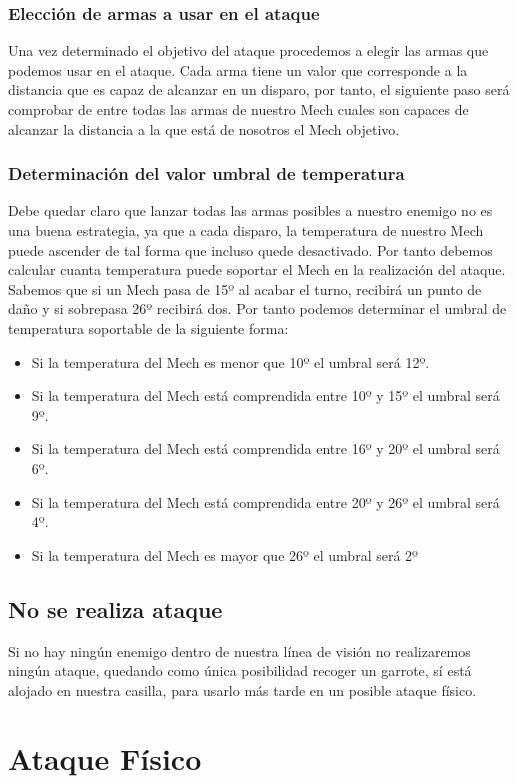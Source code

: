 \documentclass[a4paper,12pt,oneside]{book}
\begin{document}
\subsubsection{Elección de armas a usar en el ataque}
Una vez determinado el objetivo del ataque procedemos a elegir las armas que podemos usar en el ataque. Cada arma tiene un valor que corresponde a la distancia que es capaz de alcanzar en un disparo, por tanto, el siguiente paso será comprobar de entre todas las armas de nuestro Mech cuales son capaces de alcanzar la distancia a la que está de nosotros el Mech objetivo. 
\subsubsection{Determinación del valor umbral de temperatura}
Debe quedar claro que lanzar todas las armas posibles a nuestro enemigo no es una buena estrategia, ya que a cada disparo, la temperatura de nuestro Mech puede ascender de tal forma que incluso quede desactivado. Por tanto debemos calcular cuanta temperatura puede soportar el Mech en la realización del ataque. Sabemos que si un Mech pasa de 15º al acabar el turno, recibirá un punto de daño y si sobrepasa 26º recibirá dos. Por tanto podemos determinar el umbral de temperatura soportable de la siguiente forma:
\begin{itemize}
\item Si la temperatura del Mech es menor que 10º el umbral será 12º.
\item Si la temperatura del Mech está comprendida entre 10º y 15º el umbral será 9º.
\item Si la temperatura del Mech está comprendida entre 16º y 20º el umbral será 6º.
\item Si la temperatura del Mech está comprendida entre 20º y 26º el umbral será 4º.
\item Si la temperatura del Mech es mayor que 26º el umbral será 2º
\end{itemize}
\subsection{No se realiza ataque}
Si no hay ningún enemigo dentro de nuestra línea de visión no realizaremos ningún ataque, quedando como única posibilidad recoger un garrote, sí está alojado en nuestra casilla, para usarlo más tarde en un posible ataque físico.




\section{Ataque Físico}
\end{document}
